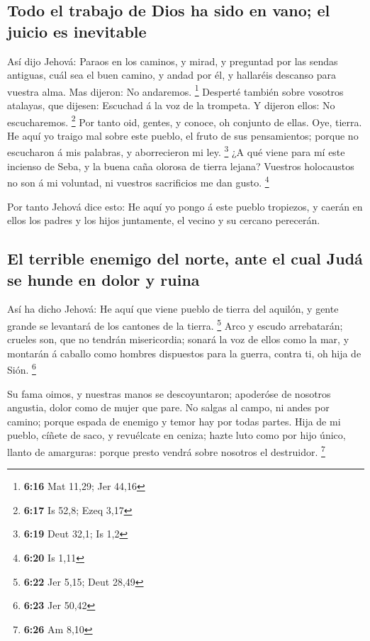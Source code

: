\hypertarget{todo-el-trabajo-de-dios-ha-sido-en-vano-el-juicio-es-inevitable}{%
\subsection{Todo el trabajo de Dios ha sido en vano; el juicio es
inevitable}\label{todo-el-trabajo-de-dios-ha-sido-en-vano-el-juicio-es-inevitable}}

 Así dijo Jehová: Paraos en los caminos, y mirad, y
preguntad por las sendas antiguas, cuál sea el buen camino, y andad por
él, y hallaréis descanso para vuestra alma. Mas dijeron: No andaremos.
\footnote{\textbf{6:16} Mat 11,29; Jer 44,16}  Desperté
también sobre vosotros atalayas, que dijesen: Escuchad á la voz de la
trompeta. Y dijeron ellos: No escucharemos. \footnote{\textbf{6:17} Is
  52,8; Ezeq 3,17}  Por tanto oid, gentes, y conoce, oh
conjunto de ellas.  Oye, tierra. He aquí yo traigo mal
sobre este pueblo, el fruto de sus pensamientos; porque no escucharon á
mis palabras, y aborrecieron mi ley. \footnote{\textbf{6:19} Deut 32,1;
  Is 1,2}  ¿A qué viene para mí este incienso de Seba, y la
buena caña olorosa de tierra lejana? Vuestros holocaustos no son á mi
voluntad, ni vuestros sacrificios me dan gusto. \footnote{\textbf{6:20}
  Is 1,11}

 Por tanto Jehová dice esto: He aquí yo pongo á este pueblo
tropiezos, y caerán en ellos los padres y los hijos juntamente, el
vecino y su cercano perecerán.

\hypertarget{el-terrible-enemigo-del-norte-ante-el-cual-juduxe1-se-hunde-en-dolor-y-ruina}{%
\subsection{El terrible enemigo del norte, ante el cual Judá se hunde en
dolor y
ruina}\label{el-terrible-enemigo-del-norte-ante-el-cual-juduxe1-se-hunde-en-dolor-y-ruina}}

 Así ha dicho Jehová: He aquí que viene pueblo de tierra
del aquilón, y gente grande se levantará de los cantones de la tierra.
\footnote{\textbf{6:22} Jer 5,15; Deut 28,49}  Arco y
escudo arrebatarán; crueles son, que no tendrán misericordia; sonará la
voz de ellos como la mar, y montarán á caballo como hombres dispuestos
para la guerra, contra ti, oh hija de Sión. \footnote{\textbf{6:23} Jer
  50,42}

 Su fama oimos, y nuestras manos se descoyuntaron;
apoderóse de nosotros angustia, dolor como de mujer que pare.
 No salgas al campo, ni andes por camino; porque espada de
enemigo y temor hay por todas partes.  Hija de mi pueblo,
cíñete de saco, y revuélcate en ceniza; hazte luto como por hijo único,
llanto de amarguras: porque presto vendrá sobre nosotros el destruidor.
\footnote{\textbf{6:26} Am 8,10}

